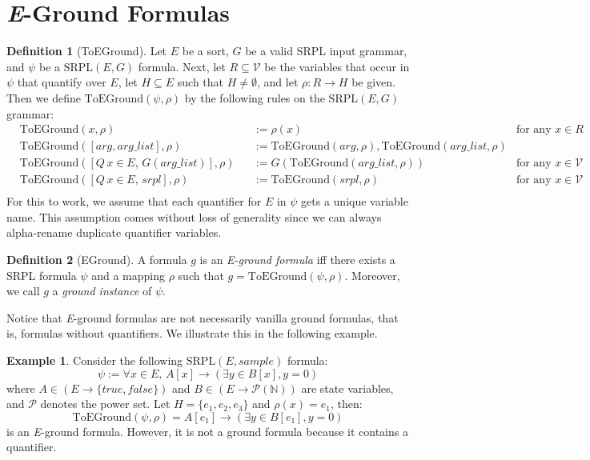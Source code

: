 \documentclass[12pt]{article}
\theoremstyle{definition}
\newtheorem{definition}{Definition}
\newtheorem{example}{Example}
\theoremstyle{remark}
\newcommand{\SRPL}{\text{SRPL}}
\newcommand{\toground}{\text{ToEGround}}
\begin{document}
\section{\textit{E}-Ground Formulas}

\begin{definition}[ToEGround]
  Let $E$ be a sort, $G$ be a valid SRPL input grammar, and $\psi$ be a $\SRPL(E,G)$ formula.  Next, let $R \subseteq \mathcal{V}$ be the variables that occur in $\psi$ that quantify over $E$, let $H \subseteq E$ such that $H \neq \emptyset$, and let $\rho : R \to H$ be given.  Then we define $\toground(\psi,\rho)$ by the following rules on the $\SRPL(E,G)$ grammar:
  \begin{align*}
    &\toground(x,\rho)& &:= \rho(x) \qquad &\text{for any } x \in R\\
    &\toground([arg,arg\_list],\rho)& &:= \toground(arg,\rho),\toground(arg\_list,\rho)\\
    &\toground([Q \, x \in E, \, G(arg\_list)],\rho)& &:= G(\toground(arg\_list,\rho)) \qquad &\text{for any } x \in \mathcal{V}\\
    &\toground([Q \, x \in E, \, srpl],\rho)& &:= \toground(srpl,\rho)  \qquad &\text{for any } x \in \mathcal{V}\\
  \end{align*}
  For this to work, we assume that each quantifier for $E$ in $\psi$ gets a unique variable name.  This assumption comes without loss of generality since we can always alpha-rename duplicate quantifier variables.
\end{definition}

\begin{definition}[EGround]
  A formula $g$ is an \textit{E-ground formula} iff there exists a SRPL formula $\psi$ and a mapping $\rho$ such that $g = \toground(\psi,\rho)$.  Moreover, we call $g$ a \textit{ground instance} of $\psi$.
\end{definition}

Notice that \textit{E}-ground formulas are not necessarily vanilla ground formulas, that is, formulas without quantifiers.  We illustrate this in the following example.

\begin{example}
  Consider the following $\SRPL(E,sample)$ formula:
  $$\psi := \forall x \in E, \, A[x] \rightarrow (\exists y \in B[x], y = 0)$$
  where $A \in (E \to \{true,false\})$ and $B \in (E \to \mathcal{P}(\mathbb{N}))$ are state variables, and $\mathcal{P}$ denotes the power set.  Let $H = \{e_1,e_2,e_3\}$ and $\rho(x) = e_1$, then:
  $$\toground(\psi,\rho) = A[e_1] \rightarrow (\exists y \in B[e_1], y = 0)$$
  is an \textit{E}-ground formula.  However, it is not a ground formula because it contains a quantifier.
\end{example}
\end{document}
